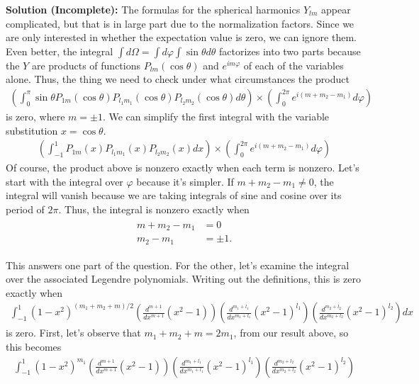 \documentclass{book}
\begin{document}
    \textbf{Solution (Incomplete):} The formulas for the spherical harmonics $Y_{lm}$ appear complicated, but that is in large part due to the normalization factors. Since we are only interested in whether the expectation value is zero, we can ignore them. Even better, the integral $\int d\Omega = \int d\varphi \int \sin\theta d\theta$ factorizes into two parts because the $Y$ are products of functions $P_{lm}(\cos\theta)$ and $e^{im\varphi}$ of each of the variables alone. Thus, the thing we need to check under what circumstances the product
    \begin{align}
        \left(\int_0^\pi \sin \theta P_{1m}(\cos\theta) P_{l_1 m_1}(\cos\theta) P_{l_2 m_2}(\cos\theta)d\theta\right) \times \left(\int_0^{2\pi} e^{i(m + m_2 - m_1)}d\varphi\right)
    \end{align}
    is zero, where $m = \pm 1$. We can simplify the first integral with the variable substitution $x = \cos\theta$.
    \begin{align}
        \left(\int_{-1}^1  P_{1m}(x) P_{l_1 m_1}(x) P_{l_2 m_2}(x)dx\right) \times \left(\int_0^{2\pi} e^{i(m + m_2 - m_1)}d\varphi\right)
    \end{align}
    Of course, the product above is nonzero exactly when each term is nonzero. Let's start with the integral over $\varphi$ because it's simpler. If $m +m_2 - m_1 \neq 0 $, the integral will vanish because we are taking integrals of sine and cosine over its period of $2\pi$. Thus, the integral is nonzero exactly when
    \begin{align}
    \begin{aligned}
        m + m_2 - m_1 &= 0 \\
        m_2 - m_1 &= \pm 1.
    \end{aligned}
    \end{align}

    This answers one part of the question. For the other, let's examine the integral over the associated Legendre polynomials. Writing out the definitions, this is zero exactly when
    \begin{align}
        \int_{-1}^1(1-x^2)^{(m_1 + m_2 + m)/2}\left(\frac{d^{m+1}}{dx^{m+1}}(x^2 - 1)\right)\left(\frac{d^{m_1+l_1}}{dx^{m_1+l_1}}(x^2 - 1)^{l_1}\right)\left(\frac{d^{m_2+l_2}}{dx^{m_2+l_2}}(x^2 - 1)^{l_2}\right) dx
    \end{align}
    is zero. First, let's observe that $m_1 + m_2 + m = 2 m_1$, from our result above, so this becomes
    \begin{align}
        \int_{-1}^1 (1-x^2)^{m_1} \left(\frac{d^{m+1}}{dx^{m+1}}(x^2 - 1)\right)\left(\frac{d^{m_1+l_1}}{dx^{m_1+l_1}}(x^2 - 1)^{l_1}\right)\left(\frac{d^{m_2+l_2}}{dx^{m_2+l_2}}(x^2 - 1)^{l_2}\right)
    \end{align}
    
\end{document}
